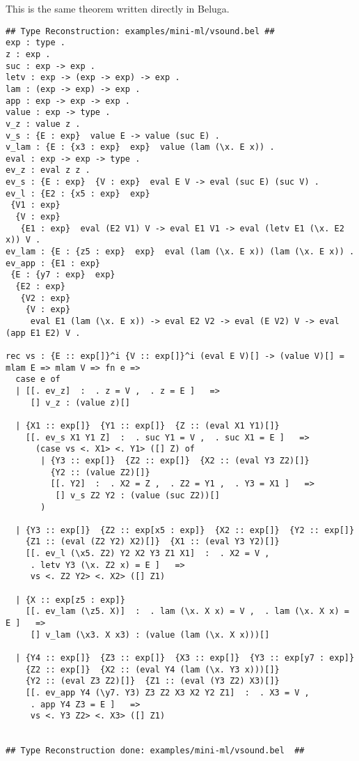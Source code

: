 \documentclass[12pt]{article}
\begin{document}
This is the same theorem written directly in \textmd{Beluga}.
\footnotesize\begin{verbatim}
## Type Reconstruction: examples/mini-ml/vsound.bel ##
exp : type .
z : exp .
suc : exp -> exp .
letv : exp -> (exp -> exp) -> exp .
lam : (exp -> exp) -> exp .
app : exp -> exp -> exp .
value : exp -> type .
v_z : value z .
v_s : {E : exp}  value E -> value (suc E) .
v_lam : {E : {x3 : exp}  exp}  value (lam (\x. E x)) .
eval : exp -> exp -> type .
ev_z : eval z z .
ev_s : {E : exp}  {V : exp}  eval E V -> eval (suc E) (suc V) .
ev_l : {E2 : {x5 : exp}  exp}
 {V1 : exp}
  {V : exp}
   {E1 : exp}  eval (E2 V1) V -> eval E1 V1 -> eval (letv E1 (\x. E2 x)) V .
ev_lam : {E : {z5 : exp}  exp}  eval (lam (\x. E x)) (lam (\x. E x)) .
ev_app : {E1 : exp}
 {E : {y7 : exp}  exp}
  {E2 : exp}
   {V2 : exp}
    {V : exp}
     eval E1 (lam (\x. E x)) -> eval E2 V2 -> eval (E V2) V -> eval (app E1 E2) V .

rec vs : {E :: exp[]}^i {V :: exp[]}^i (eval E V)[] -> (value V)[] =
mlam E => mlam V => fn e =>
  case e of
  | [[. ev_z]  :  . z = V ,  . z = E ]   =>
     [] v_z : (value z)[]

  | {X1 :: exp[]}  {Y1 :: exp[]}  {Z :: (eval X1 Y1)[]}
    [[. ev_s X1 Y1 Z]  :  . suc Y1 = V ,  . suc X1 = E ]   =>
      (case vs <. X1> <. Y1> ([] Z) of
       | {Y3 :: exp[]}  {Z2 :: exp[]}  {X2 :: (eval Y3 Z2)[]}
         {Y2 :: (value Z2)[]}
         [[. Y2]  :  . X2 = Z ,  . Z2 = Y1 ,  . Y3 = X1 ]   =>
          [] v_s Z2 Y2 : (value (suc Z2))[]
       )

  | {Y3 :: exp[]}  {Z2 :: exp[x5 : exp]}  {X2 :: exp[]}  {Y2 :: exp[]}
    {Z1 :: (eval (Z2 Y2) X2)[]}  {X1 :: (eval Y3 Y2)[]}
    [[. ev_l (\x5. Z2) Y2 X2 Y3 Z1 X1]  :  . X2 = V ,
     . letv Y3 (\x. Z2 x) = E ]   =>
     vs <. Z2 Y2> <. X2> ([] Z1)

  | {X :: exp[z5 : exp]}
    [[. ev_lam (\z5. X)]  :  . lam (\x. X x) = V ,  . lam (\x. X x) = E ]   =>
     [] v_lam (\x3. X x3) : (value (lam (\x. X x)))[]

  | {Y4 :: exp[]}  {Z3 :: exp[]}  {X3 :: exp[]}  {Y3 :: exp[y7 : exp]}
    {Z2 :: exp[]}  {X2 :: (eval Y4 (lam (\x. Y3 x)))[]}
    {Y2 :: (eval Z3 Z2)[]}  {Z1 :: (eval (Y3 Z2) X3)[]}
    [[. ev_app Y4 (\y7. Y3) Z3 Z2 X3 X2 Y2 Z1]  :  . X3 = V ,
     . app Y4 Z3 = E ]   =>
     vs <. Y3 Z2> <. X3> ([] Z1)


## Type Reconstruction done: examples/mini-ml/vsound.bel  ##

\end{verbatim}
\end{document}
